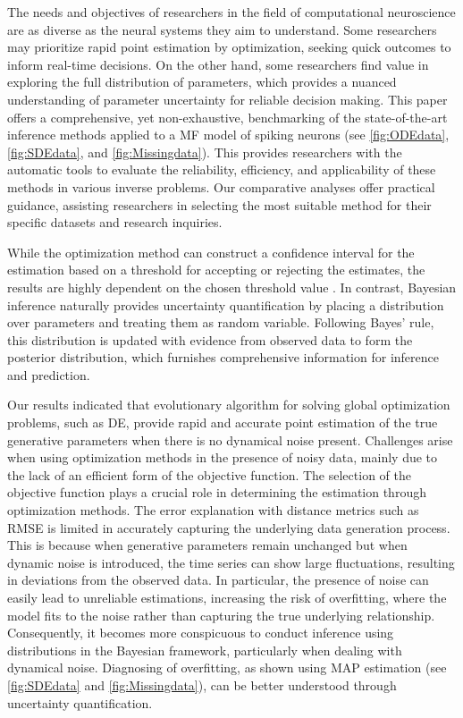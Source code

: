 \documentclass[preprint,11pt,authoryear]{elsarticle}
\begin{document}
The needs and objectives of researchers in the field of computational neuroscience are as diverse as the neural systems they aim to understand. Some researchers may prioritize rapid point estimation by optimization, seeking quick outcomes to inform real-time decisions. On the other hand, some researchers find value in exploring the full distribution of parameters, which provides a nuanced understanding of parameter uncertainty for reliable decision making. This paper offers a comprehensive, yet non-exhaustive, benchmarking of the state-of-the-art inference methods applied to a MF model of spiking neurons (see \autoref{fig:ODEdata}, \autoref{fig:SDEdata}, and \autoref{fig:Missingdata}). This provides researchers with the automatic tools to evaluate the reliability, efficiency, and applicability of these methods in various inverse problems. Our comparative analyses offer practical guidance, assisting researchers in selecting the most suitable method for their specific datasets and research inquiries. 


While the optimization method can construct a confidence interval for the estimation based on a threshold for accepting or rejecting the estimates, the results are highly dependent on the chosen threshold value \citep{Beaumont2002, Cranmer2020}. In contrast, Bayesian inference naturally provides uncertainty quantification by placing a distribution over parameters and treating them as random variable. Following Bayes' rule, this distribution is updated with evidence from observed data to form the posterior distribution, which furnishes comprehensive information for inference and prediction. 


Our results indicated that evolutionary algorithm for solving global optimization problems, such as DE, provide rapid and accurate point estimation of the true generative parameters when there is no dynamical noise present.
Challenges arise when using optimization methods in the presence of noisy data, mainly due to the lack of an efficient form of the objective function. The selection of the objective function plays a crucial role in determining the estimation through optimization methods. The error explanation with distance metrics such as RMSE is limited in accurately capturing the underlying data generation process. This is because when generative parameters remain unchanged but when dynamic noise is introduced, the time series can show large fluctuations, resulting in deviations from the observed data. In particular, the presence of noise can easily lead to unreliable estimations, increasing the risk of overfitting, where the model fits to the noise rather than capturing the true underlying relationship. Consequently, it becomes more conspicuous to conduct inference using distributions in the Bayesian framework, particularly when dealing with dynamical noise.  Diagnosing of overfitting, as shown using MAP estimation (see \autoref{fig:SDEdata} and \autoref{fig:Missingdata}), can be better understood through uncertainty quantification. 
\end{document}
